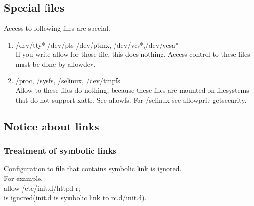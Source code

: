 \documentclass{article}
\begin{document}
\subsection{Special files}
Access to following files are special.
\begin{enumerate}
 \item  /dev/tty* /dev/pts /dev/ptmx, /dev/vcs*,/dev/vcsa*\\
	If you write allow for those file, this does nothing.
	Access control to these files must be done by allowdev. 
 \item  /proc, /sysfs, /selinux, /dev/tmpfs\\
	Allow to these files do nothing, because these files are mounted
	on filesystems that do not support xattr. See allowfs. For
	/selinux see allowpriv getsecurity.
\end{enumerate}


\subsection{Notice about links}
\subsubsection{Treatment of symbolic links}
 Configuration to file that contains symbolic link is ignored.\\
       For example, \\
       allow /etc/init.d/httpd r;\\
       is ignored(init.d is symbolic link to rc.d/init.d).
\end{document}
